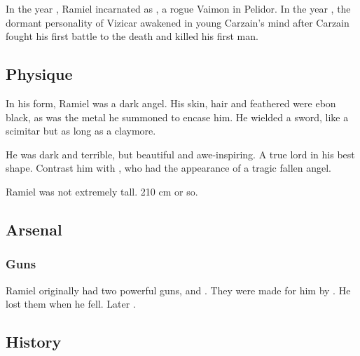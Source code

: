 In the year , Ramiel incarnated as \CarzainDeracilleShireyo, a rogue Vaimon in Pelidor. In the year , the dormant personality of Vizicar awakened in young Carzain's mind after Carzain fought his first battle to the death and killed his first man. 









\subsection{Physique}
In his \resphan{} form, Ramiel was a dark angel. 
His skin, hair and feathered were ebon black, as was the metal \armour he summoned to encase him. 
He wielded a sword, like a scimitar but as long as a claymore. 

He was dark and terrible, but beautiful and awe-inspiring. 
A true \sathariah{} lord in his best shape. 
Contrast him with , who had the appearance of a tragic fallen angel.

Ramiel was not extremely tall. 210 cm or so. 









\subsection{Arsenal}





\subsubsection{Guns}
\index{\Currah}
\index{\Strith}
Ramiel originally had two powerful guns, \Strith{} and \Currah. 
They were made for him by \Lyorith. 
He lost them when he fell. 
Later . 









\subsection{History}
